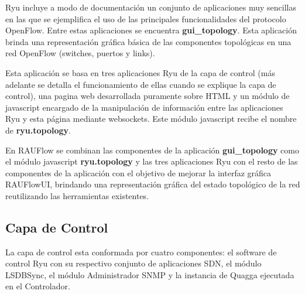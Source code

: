Ryu incluye a modo de documentaci\'on un conjunto de aplicaciones muy sencillas en las que se ejemplifica el uso de las principales funcionalidades del protocolo OpenFlow. Entre estas aplicaciones se encuentra \textbf{gui\_topology}. Esta aplicaci\'on brinda una representaci\'on gr\'afica b\'asica de las componentes topol\'ogicas en una red OpenFlow (switches, puertos y links).

Esta aplicaci\'on se basa en tres aplicaciones Ryu de la capa de control (m\'as adelante se detalla el funcionamiento de ellas cuando se explique la capa de control), una pagina web desarrollada puramente sobre HTML y un m\'odulo de javascript encargado de la manipulaci\'on de informaci\'on entre las aplicaciones Ryu y esta p\'agina mediante websockets. Este m\'odulo javascript recibe el nombre de \textbf{ryu.topology}.

En RAUFlow se combinan las componentes de la aplicaci\'on \textbf{gui\_topology} como el m\'odulo javascript \textbf{ryu.topology} y las tres aplicaciones Ryu con el resto de las componentes de la aplicaci\'on con el objetivo de mejorar la interfaz gr\'afica RAUFlowUI, brindando una representaci\'on gr\'afica del estado topol\'ogico de la red reutilizando las herramientas existentes.\\
 

\subsection{Capa de Control}

La capa de control esta conformada por cuatro componentes: el software de control Ryu con su respectivo conjunto de aplicaciones SDN, el m\'odulo LSDBSync, el m\'odulo Administrador SNMP y la instancia de Quagga ejecutada en el Controlador.\\

 

